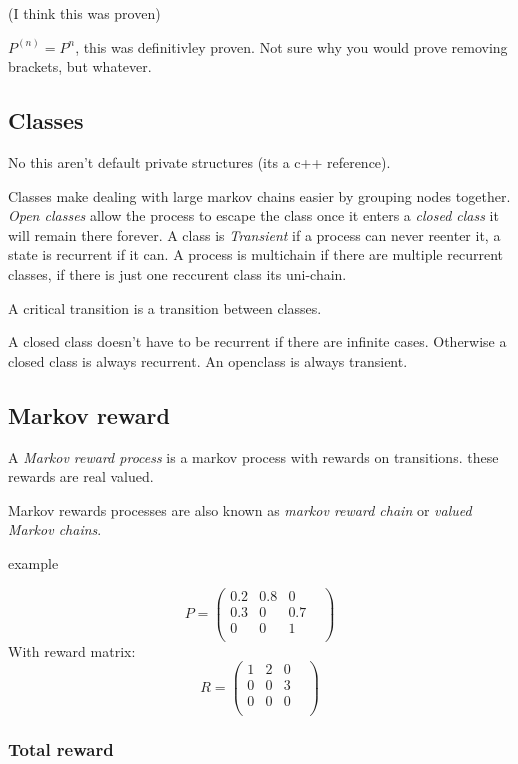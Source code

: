 \documentclass{article}
\begin{document}
(I think this was proven)

$P^{(n)} = P^n$, this was definitivley proven. Not sure why you would
prove removing brackets, but whatever.

\subsection{Classes}
No this aren't default private structures (its a c++ reference).

Classes make dealing with large markov chains easier by grouping nodes
together. \emph{Open classes} allow the process to escape the class once
it enters a \emph{closed class} it will remain there forever.
A class is \emph{Transient} if a process can never reenter it, a
state is recurrent if it can. A process is multichain if there are
multiple recurrent classes, if there is just one reccurent class
its uni-chain.

A critical transition is a transition between classes.

A closed class doesn't have to be recurrent if there are infinite cases.
Otherwise a closed class is always recurrent.
An openclass is always transient.

\subsection{Markov reward}
A \emph{Markov reward process} is a markov process with rewards on
transitions. these rewards are real valued.

Markov rewards processes are also known as \emph{markov reward chain} or
\emph{valued Markov chains}.

example

\[
	P =
\begin{pmatrix}
	0.2	& 0.8 & 0 	& \\
	0.3	& 0	& 0.7	& \\
	0	& 0 & 1	& \\
\end{pmatrix}
\]
With reward matrix:
\[
	R =
\begin{pmatrix}
	1	& 2 & 0 	& \\
	0	& 0	& 3	& \\
	0	& 0 & 0	& \\
\end{pmatrix}
\]

\subsubsection{Total reward}
\end{document}
